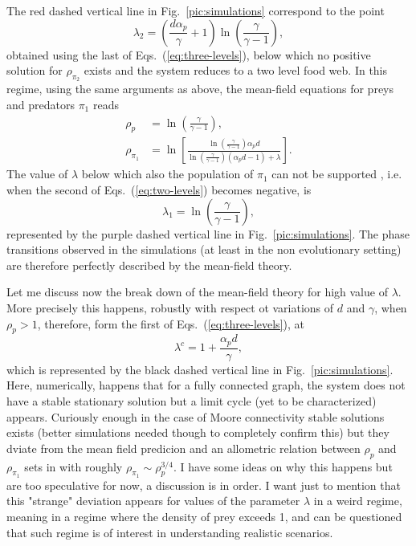 \documentclass[10pt]{article}
\begin{document}
The red dashed vertical line in Fig.~\ref{pic:simulations} correspond to the point
\begin{equation}
\label{eq:lambda2}
\lambda_2 = \left(\frac{d\alpha_p}{\gamma}+1\right)\ln\left(\frac{\gamma}{\gamma-1}\right) ,
\end{equation}
obtained using the last of Eqs.~(\ref{eq:three-levels}),
below which no positive solution for $\rho_{\pi_2}$ exists and the system reduces to a two level
food web. In this regime, using the same arguments as above, the mean-field equations for preys and
predators $\pi_1$ reads
\begin{align}
\label{eq:two-levels}
\rho_p &= \ln \left(\frac{\gamma}{\gamma -1}\right) , \nonumber \\
\rho_{\pi_1} &= \ln\left[\frac{\ln\left(\frac{\gamma}{\gamma-1}\right)\alpha_p d}{\ln\left(\frac{\gamma}{\gamma-1}\right)(\alpha_p d -1)+\lambda}\right].
\end{align}
The value of $\lambda$ below which also the population of $\pi_1$ can not be supported
, i.e. when the second of Eqs.~(\ref{eq:two-levels}) becomes negative, is
\begin{equation}
\label{eq:lambda1}
\lambda_1= \ln \left(\frac{\gamma}{\gamma -1}\right),
\end{equation}
represented by the purple dashed vertical line in Fig.~\ref{pic:simulations}.
The phase transitions observed in the simulations (at least in the non evolutionary setting)
are therefore perfectly described by the mean-field theory.

Let me discuss now the break down of the mean-field theory for high value of $\lambda$.
More precisely this happens, robustly with respect ot variations of $d$ and $\gamma$,
when $\rho_p>1$, therefore, form the first of Eqs.~(\ref{eq:three-levels}), at
\begin{equation}
\lambda^c=1+\frac{\alpha_p d}{\gamma},
\end{equation}
which is represented by the black dashed vertical line in Fig.~\ref{pic:simulations}.
Here, numerically, happens that for a fully connected graph, the system does not have a stable
stationary solution but a limit cycle (yet to be characterized) appears. Curiously
enough in the case of Moore connectivity stable solutions exists (better simulations needed though
to completely confirm this) but they dviate from the
mean field predicion and an allometric relation between $\rho_p$ and $\rho_{\pi_1}$ sets in
with roughly $\rho_{\pi_1}\sim\rho_p^{3/4}$. I have some ideas on why this happens but are too
speculative for now, a discussion is in order. I want just to mention that this "strange" deviation
appears for values of the parameter $\lambda$ in a weird regime, meaning in a regime where the
density of prey exceeds 1, and can be questioned that such regime is of interest in understanding
realistic scenarios.
\end{document}
